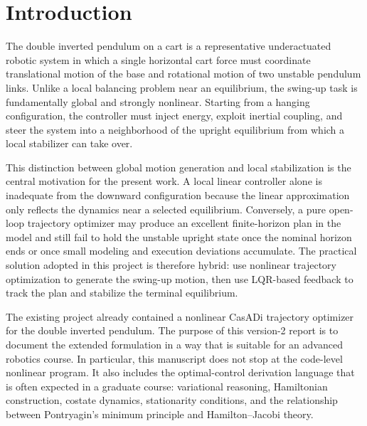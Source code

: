 \documentclass[conference]{IEEEtran}
\begin{document}
\section{Introduction}
The double inverted pendulum on a cart is a representative underactuated robotic system in which a single horizontal cart force must coordinate translational motion of the base and rotational motion of two unstable pendulum links. Unlike a local balancing problem near an equilibrium, the swing-up task is fundamentally global and strongly nonlinear. Starting from a hanging configuration, the controller must inject energy, exploit inertial coupling, and steer the system into a neighborhood of the upright equilibrium from which a local stabilizer can take over.

This distinction between global motion generation and local stabilization is the central motivation for the present work. A local linear controller alone is inadequate from the downward configuration because the linear approximation only reflects the dynamics near a selected equilibrium. Conversely, a pure open-loop trajectory optimizer may produce an excellent finite-horizon plan in the model and still fail to hold the unstable upright state once the nominal horizon ends or once small modeling and execution deviations accumulate. The practical solution adopted in this project is therefore hybrid: use nonlinear trajectory optimization to generate the swing-up motion, then use LQR-based feedback to track the plan and stabilize the terminal equilibrium.

The existing project already contained a nonlinear CasADi trajectory optimizer for the double inverted pendulum. The purpose of this version-2 report is to document the extended formulation in a way that is suitable for an advanced robotics course. In particular, this manuscript does not stop at the code-level nonlinear program. It also includes the optimal-control derivation language that is often expected in a graduate course: variational reasoning, Hamiltonian construction, costate dynamics, stationarity conditions, and the relationship between Pontryagin's minimum principle and Hamilton--Jacobi theory.
\end{document}
